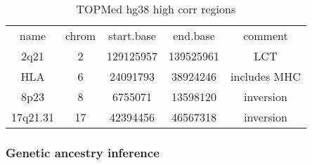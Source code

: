 \documentclass[12pt]{article}
\begin{document}
\begin{table}
\begin{tabular}{ccccc}
name & chrom & start.base  & end.base  & comment \\
2q21    &  2  &  129125957 & 139525961       &  LCT \\
HLA      &    6 &   24091793  & 38924246 & includes MHC \\
8p23  &        8   &  6755071 &  13598120 &   inversion \\
17q21.31 &    17  &  42394456 & 46567318   &  inversion \\
\end{tabular}
\caption{TOPMed hg38 high corr regions}
\end{table}

\subsubsection{Genetic ancestry inference}
\end{document}
